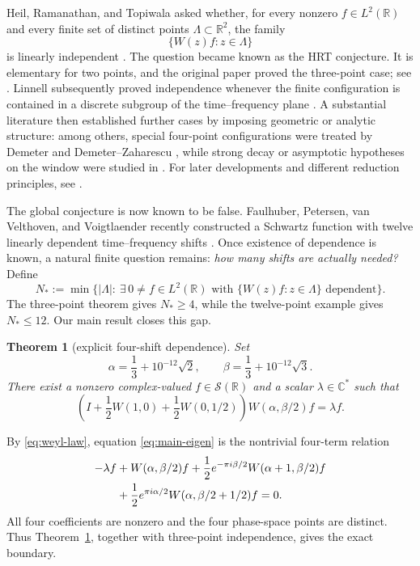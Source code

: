\documentclass[11pt]{amsart}
\newtheorem{theorem}{Theorem}[section]
\theoremstyle{remark}
\newcommand{\R}{\mathbb R}
\newcommand{\C}{\mathbb C}
\newcommand{\cS}{\mathcal S}
\begin{document}
Heil, Ramanathan, and Topiwala asked whether, for every nonzero
$f\in L^2(\R)$ and every finite set of distinct points
$\Lambda\subset\R^2$, the family
\[
 \{W(z)f:z\in\Lambda\}
\]
is linearly independent \cite[p.~2790]{HRT96}.  The question became known as
the HRT conjecture.  It is elementary for two points, and the original paper
proved the three-point case; see \cite[Theorem~1, pp.~2791--2792]{HRT96}.
Linnell subsequently proved independence whenever the finite configuration is
contained in a discrete subgroup of the time--frequency plane
\cite[Proposition~1.3, p.~3270]{Linnell99}.  A substantial literature then
established further cases by imposing geometric or analytic structure: among
others, special four-point configurations were treated by Demeter
\cite{Demeter10} and Demeter--Zaharescu \cite{DemeterZaharescu12}, while strong
decay or asymptotic hypotheses on the window were studied in
\cite{BenedettoBourouihiya15,BownikSpeegle13}.  For later developments and
different reduction principles, see \cite{Grochenig15,Heil06,Liu19,Okoudjou19}.

The global conjecture is now known to be false.  Faulhuber, Petersen,
van Velthoven, and Voigtlaender recently constructed a Schwartz function with
twelve linearly dependent time--frequency shifts \cite[Theorem~1.1]{FPVV26}.  Once
existence of dependence is known, a natural finite question remains:
\emph{how many shifts are actually needed?}  Define
\[
 N_*:=\min\bigl\{|\Lambda|:\ \exists\,0\ne f\in L^2(\R)
 \text{ with }\{W(z)f:z\in\Lambda\}\text{ dependent}\bigr\}.
\]
The three-point theorem gives $N_*\ge4$, while the twelve-point example gives
$N_*\le12$.  Our main result closes this gap.

\begin{theorem}[explicit four-shift dependence]\label{thm:main}
Set
\begin{equation}\label{eq:explicit-tau}
 \alpha=\frac13+10^{-12}\sqrt2,
 \qquad
 \beta=\frac13+10^{-12}\sqrt3.
\end{equation}
There exist a nonzero complex-valued $f\in\cS(\R)$ and a scalar
$\lambda\in\C^*$ such that
\begin{equation}\label{eq:main-eigen}
 \left(I+\frac12W(1,0)+\frac12W(0,1/2)\right)
 W(\alpha,\beta/2)f=\lambda f.
\end{equation}
\end{theorem}

By \eqref{eq:weyl-law}, equation \eqref{eq:main-eigen} is the nontrivial
four-term relation
\begin{align}\label{eq:four-relation}
 -\lambda f
 &+W(\alpha,\beta/2)f
 +\frac12e^{-\pi i\beta/2}W(\alpha+1,\beta/2)f \notag\\
 &+\frac12e^{\pi i\alpha/2}W(\alpha,\beta/2+1/2)f=0.
\end{align}
All four coefficients are nonzero and the four phase-space points are
distinct.  Thus Theorem~\ref{thm:main}, together with three-point
independence, gives the exact boundary.
\end{document}
